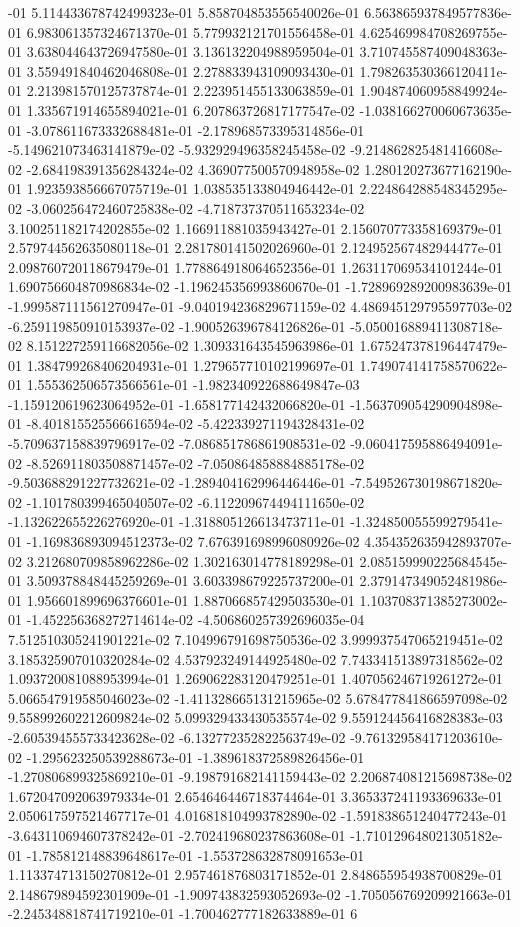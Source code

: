 -01	5.114433678742499323e-01	5.858704853556540026e-01	6.563865937849577836e-01	6.983061357324671370e-01	5.779932121701556458e-01	4.625469984708269755e-01	3.638044643726947580e-01	3.136132204988959504e-01	3.710745587409048363e-01	3.559491840462046808e-01	2.278833943109093430e-01	1.798263530366120411e-01	2.213981570125737874e-01	2.223951455133063859e-01	1.904874060958849924e-01	1.335671914655894021e-01	6.207863726817177547e-02	-1.038166270060673635e-01	-3.078611673332688481e-01	-2.178968573395314856e-01	-5.149621073463141879e-02	-5.932929496358245458e-02	-9.214862825481416608e-02	-2.684198391356284324e-02	4.369077500570948958e-02	1.280120273677162190e-01	1.923593856667075719e-01	1.038535133804946442e-01	2.224864288548345295e-02	-3.060256472460725838e-02	-4.718737370511653234e-02	3.100251182174202855e-02	1.166911881035943427e-01	2.156070773358169379e-01	2.579744562635080118e-01	2.281780141502026960e-01	2.124952567482944477e-01	2.098760720118679479e-01	1.778864918064652356e-01	1.263117069534101244e-01	1.690756604870986834e-02	-1.196245356993860670e-01	-1.728969289200983639e-01	-1.999587111561270947e-01	-9.040194236829671159e-02	4.486945129795597703e-02	-6.259119850910153937e-02	-1.900526396784126826e-01	-5.050016889411308718e-02	8.151227259116682056e-02	1.309331643545963986e-01	1.675247378196447479e-01	1.384799268406204931e-01	1.279657710102199697e-01	1.749074141758570622e-01	1.555362506573566561e-01	-1.982340922688649847e-03	-1.159120619623064952e-01	-1.658177142432066820e-01	-1.563709054290904898e-01	-8.401815525566616594e-02	-5.422339271194328431e-02	-5.709637158839796917e-02	-7.086851786861908531e-02	-9.060417595886494091e-02	-8.526911803508871457e-02	-7.050864858884885178e-02	-9.503688291227732621e-02	-1.289404162996446446e-01	-7.549526730198671820e-02	-1.101780399465040507e-02	-6.112209674494111650e-02	-1.132622655226276920e-01	-1.318805126613473711e-01	-1.324850055599279541e-01	-1.169836893094512373e-02	7.676391698996080926e-02	4.354352635942893707e-02	3.212680709858962286e-02	1.302163014778189298e-01	2.085159990225684545e-01	3.509378848445259269e-01	3.603398679225737200e-01	2.379147349052481986e-01	1.956601899696376601e-01	1.887066857429503530e-01	1.103708371385273002e-01	-1.452256368272714614e-02	-4.506860257392696035e-04	7.512510305241901221e-02	7.104996791698750536e-02	3.999937547065219451e-02	3.185325907010320284e-02	4.537923249144925480e-02	7.743341513897318562e-02	1.093720081088953994e-01	1.269062283120479251e-01	1.407056246719261272e-01	5.066547919585046023e-02	-1.411328665131215965e-02	5.678477841866597098e-02	9.558992602212609824e-02	5.099329433430535574e-02	9.559124456416828383e-03	-2.605394555733423628e-02	-6.132772352822563749e-02	-9.761329584171203610e-02	-1.295623250539288673e-01	-1.389618372589826456e-01	-1.270806899325869210e-01	-9.198791682141159443e-02	2.206874081215698738e-02	1.672047092063979334e-01	2.654646446718374464e-01	3.365337241193369633e-01	2.050617597521467717e-01	4.016818104993782890e-02	-1.591838651240477243e-01	-3.643110694607378242e-01	-2.702419680237863608e-01	-1.710129648021305182e-01	-1.785812148839648617e-01	-1.553728632878091653e-01	1.113374713150270812e-01	2.957461876803171852e-01	2.848655954938700829e-01	2.148679894592301909e-01	-1.909743832593052693e-02	-1.705056769209921663e-01	-2.245348818741719210e-01	-1.700462777182633889e-01	6